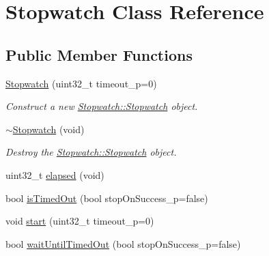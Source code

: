 \hypertarget{class_stopwatch}{}\section{Stopwatch Class Reference}
\label{class_stopwatch}
\subsection*{Public Member Functions}
\begin{DoxyCompactItemize}
\item 
\hyperlink{class_stopwatch_a9ec058b9a0ee972664043d7233aa4c3f}{Stopwatch} (uint32\+\_\+t timeout\+\_\+p=0)
\begin{DoxyCompactList}\small\item\em Construct a new \hyperlink{class_stopwatch_a9ec058b9a0ee972664043d7233aa4c3f}{Stopwatch\+::\+Stopwatch} object. \end{DoxyCompactList}\item 
\hypertarget{class_stopwatch_a720bc3d0a4f7848968247b08982c3e51}{}\hyperlink{class_stopwatch_a720bc3d0a4f7848968247b08982c3e51}{$\sim$\+Stopwatch} (void)\label{class_stopwatch_a720bc3d0a4f7848968247b08982c3e51}

\begin{DoxyCompactList}\small\item\em Destroy the \hyperlink{class_stopwatch_a9ec058b9a0ee972664043d7233aa4c3f}{Stopwatch\+::\+Stopwatch} object. \end{DoxyCompactList}\item 
uint32\+\_\+t \hyperlink{class_stopwatch_ac823faab40c6c86e8f61fead1cf21fcf}{elapsed} (void)
\item 
bool \hyperlink{class_stopwatch_a19d5551772cb3d42e6edc7e77fff1120}{is\+Timed\+Out} (bool stop\+On\+Success\+\_\+p=false)
\item 
void \hyperlink{class_stopwatch_aeb9549ad4cf245c3bf491c8d8e6ad84a}{start} (uint32\+\_\+t timeout\+\_\+p=0)
\item 
bool \hyperlink{class_stopwatch_a35ce02715e10a56d39c3aaf68ccc4726}{wait\+Until\+Timed\+Out} (bool stop\+On\+Success\+\_\+p=false)
\end{DoxyCompactItemize}
